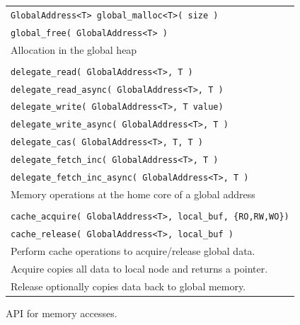 \begin{figure}[htbp]
  \begin{center}
    \begin{minipage}{\columnwidth}
	\small
	\begin{tabular}{l}
      	\texttt{\scriptsize GlobalAddress<T> global\_malloc<T>( size )} \\
      	\texttt{\scriptsize global\_free( GlobalAddress<T> )} \\ 
      	Allocation in the global heap \\ \\
      	\texttt{\scriptsize delegate\_read( GlobalAddress<T>, T )}  \\
      	\texttt{\scriptsize delegate\_read\_async( GlobalAddress<T>, T )}  \\
      	\texttt{\scriptsize delegate\_write( GlobalAddress<T>, T value)} \\
      	\texttt{\scriptsize delegate\_write\_async( GlobalAddress<T>, T )} \\
      	\texttt{\scriptsize delegate\_cas( GlobalAddress<T>, T, T )} \\
      	\texttt{\scriptsize delegate\_fetch\_inc( GlobalAddress<T>, T )} \\
      	\texttt{\scriptsize delegate\_fetch\_inc\_async( GlobalAddress<T>, T )} \\ 
      	Memory operations at the home core of a global address \\ \\
      	\texttt{\scriptsize cache\_acquire( GlobalAddress<T>, local\_buf, \{RO,RW,WO\})} \\
      	\texttt{\scriptsize cache\_release( GlobalAddress<T>, local\_buf )} \\ 
		Perform cache operations to acquire/release global data.  \\
		Acquire copies all data to local node and returns a pointer. \\ 	
		Release optionally copies data back to global memory. \\
	\end{tabular}
      \caption{\label{fig:accessing-memory} \Grappa API for memory accesses.}     \end{minipage}
  \end{center}
\end{figure}

